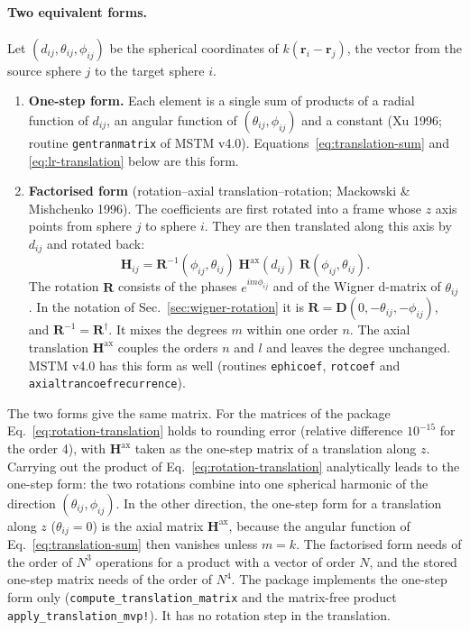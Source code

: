 \documentclass[11pt,a4paper]{article}
\begin{document}
\paragraph{Two equivalent forms.}
Let $(d_{ij}, \theta_{ij}, \phi_{ij})$ be the spherical coordinates of $k(\bm{r}_i - \bm{r}_j)$, the vector from the source sphere $j$ to the target sphere $i$.
\begin{enumerate}[nosep]
  \item \textbf{One-step form.}
  Each element is a single sum of products of a radial function of $d_{ij}$, an angular function of $(\theta_{ij}, \phi_{ij})$ and a constant (Xu 1996; routine \texttt{gentranmatrix} of MSTM v4.0).
  Equations~\eqref{eq:translation-sum} and \eqref{eq:lr-translation} below are this form.
  \item \textbf{Factorised form} (rotation--axial translation--rotation; Mackowski \& Mishchenko 1996).
  The coefficients are first rotated into a frame whose $z$ axis points from sphere $j$ to sphere $i$.
  They are then translated along this axis by $d_{ij}$ and rotated back:
  \begin{equation}
    \mathbf{H}_{ij} = \mathbf{R}^{-1}(\phi_{ij}, \theta_{ij})\;\mathbf{H}^\mathrm{ax}(d_{ij})\;\mathbf{R}(\phi_{ij}, \theta_{ij}).
    \label{eq:rotation-translation}
  \end{equation}
  The rotation $\mathbf{R}$ consists of the phases $e^{im\phi_{ij}}$ and of the Wigner d-matrix of $\theta_{ij}$.
  In the notation of Sec.~\ref{sec:wigner-rotation} it is $\mathbf{R} = \mathbf{D}(0, -\theta_{ij}, -\phi_{ij})$, and $\mathbf{R}^{-1} = \mathbf{R}^\dagger$.
  It mixes the degrees $m$ within one order $n$.
  The axial translation $\mathbf{H}^\mathrm{ax}$ couples the orders $n$ and $l$ and leaves the degree unchanged.
  MSTM v4.0 has this form as well (routines \texttt{ephicoef}, \texttt{rotcoef} and \texttt{axialtrancoefrecurrence}).
\end{enumerate}
The two forms give the same matrix.
For the matrices of the package Eq.~\eqref{eq:rotation-translation} holds to rounding error (relative difference $10^{-15}$ for the order 4), with $\mathbf{H}^\mathrm{ax}$ taken as the one-step matrix of a translation along $z$.
Carrying out the product of Eq.~\eqref{eq:rotation-translation} analytically leads to the one-step form: the two rotations combine into one spherical harmonic of the direction $(\theta_{ij}, \phi_{ij})$.
In the other direction, the one-step form for a translation along $z$ ($\theta_{ij} = 0$) is the axial matrix $\mathbf{H}^\mathrm{ax}$, because the angular function of Eq.~\eqref{eq:translation-sum} then vanishes unless $m = k$.
The factorised form needs of the order of $N^3$ operations for a product with a vector of order $N$, and the stored one-step matrix needs of the order of $N^4$.
The package implements the one-step form only (\texttt{compute\_translation\_matrix} and the matrix-free product \texttt{apply\_translation\_mvp!}).
It has no rotation step in the translation.
\end{document}

